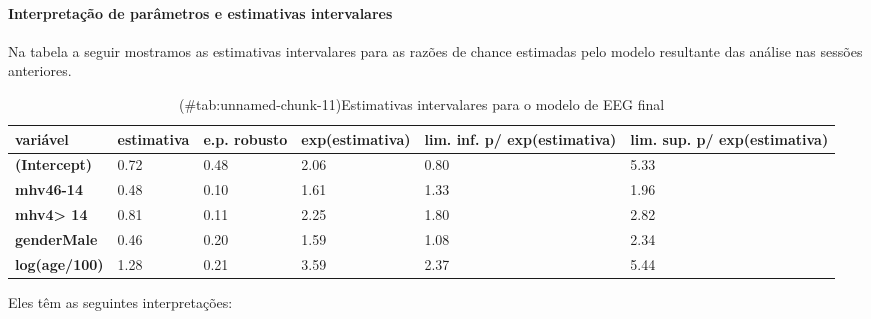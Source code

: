 \documentclass[
  11pt,
]{article}
\begin{document}
\hypertarget{interpretauxe7uxe3o-de-paruxe2metros-e-estimativas-intervalares}{%
\paragraph{Interpretação de parâmetros e estimativas intervalares}\label{interpretauxe7uxe3o-de-paruxe2metros-e-estimativas-intervalares}}

Na tabela a seguir mostramos as estimativas intervalares para as razões de chance estimadas pelo modelo resultante das análise nas sessões anteriores.

\begin{table}

\caption{(\#tab:unnamed-chunk-11)Estimativas intervalares para o modelo de EEG final}
\centering
\fontsize{12}{14}\selectfont
\begin{tabu} to 
\toprule
variável & estimativa & e.p. robusto & exp(estimativa) & lim. inf. p/ exp(estimativa) & lim. sup. p/ exp(estimativa)\\
\midrule
\textbf{(Intercept)} & 0.72 & 0.48 & 2.06 & 0.80 & 5.33\\
\textbf{mhv46-14} & 0.48 & 0.10 & 1.61 & 1.33 & 1.96\\
\textbf{mhv4> 14} & 0.81 & 0.11 & 2.25 & 1.80 & 2.82\\
\textbf{genderMale} & 0.46 & 0.20 & 1.59 & 1.08 & 2.34\\
\textbf{log(age/100)} & 1.28 & 0.21 & 3.59 & 2.37 & 5.44\\
\bottomrule
\end{tabu}
\end{table}

Eles têm as seguintes interpretações:
\end{document}
